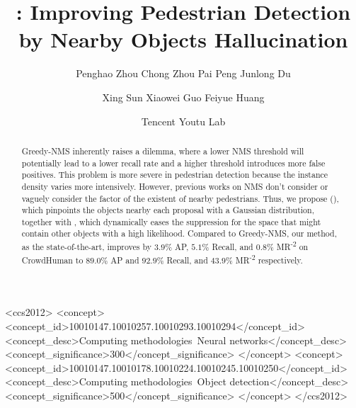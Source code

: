 \documentclass[sigconf]{acmart}
\begin{document}
\title{\nmsname{}: Improving Pedestrian Detection by Nearby Objects Hallucination}



\author{Penghao Zhou \quad Chong Zhou \quad Pai Peng \quad Junlong Du}
\author{Xing Sun \quad Xiaowei Guo \quad Feiyue Huang}
\author{Tencent Youtu Lab}


\renewcommand{\shortauthors}{Zhou, et al.}



\begin{abstract}
    Greedy-NMS inherently raises a dilemma, where a lower NMS threshold will potentially lead to a lower recall rate and a higher threshold introduces more false positives. This problem is more severe in pedestrian detection because the instance density varies more intensively. However, previous works on NMS don't consider or vaguely consider the factor of the existent of nearby pedestrians. Thus, we propose \heatmapname{} (\heatmapnameshort{}), which pinpoints the objects nearby each proposal with a Gaussian distribution, together with \nmsname{}, which dynamically eases the suppression for the space that might contain other objects with a high likelihood. Compared to Greedy-NMS, our method, as the state-of-the-art, improves by $3.9\%$ AP, $5.1\%$ Recall, and $0.8\%$ MR\textsuperscript{-2} on CrowdHuman to $89.0\%$ AP and $92.9\%$ Recall, and $43.9\%$ MR\textsuperscript{-2} respectively.
    
\end{abstract}



\begin{CCSXML}
<ccs2012>
   <concept>
       <concept_id>10010147.10010257.10010293.10010294</concept_id>
       <concept_desc>Computing methodologies~Neural networks</concept_desc>
       <concept_significance>300</concept_significance>
       </concept>
   <concept>
       <concept_id>10010147.10010178.10010224.10010245.10010250</concept_id>
       <concept_desc>Computing methodologies~Object detection</concept_desc>
       <concept_significance>500</concept_significance>
       </concept>
 </ccs2012>
\end{CCSXML}





\maketitle
\end{document}
